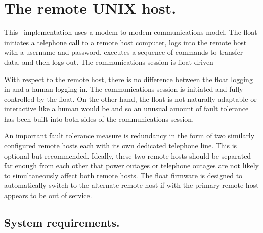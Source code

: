 %
%
%
%
%

\newcommand{\mgetty}{\textbf{mgetty}}
\renewcommand{\-}{\~{\hspace{0in}}}

\section{The remote UNIX host.}
\label{sec:RemoteHost}  

This \iridium\ implementation uses a modem-to-modem communications model.  The
float initiates a telephone call to a remote host computer, logs into the
remote host with a username and password, executes a sequence of commands to
transfer data, and then logs out.  The communications session is float-driven

With respect to the remote host, there is no difference between the float
logging in and a human logging in.  The communications session is initiated
and fully controlled by the float.  On the other hand, the float is not
naturally adaptable or interactive like a human would be and so an unusual
amount of fault tolerance has been built into both sides of the
communications session.

An important fault tolerance measure is redundancy in the form of two
similarly configured remote hosts each with its own dedicated telephone
line.  This is optional but recommended.  Ideally, these two remote hosts
should be separated far enough from each other that power outages or
telephone outages are not likely to simultaneously affect both remote hosts.
The float firmware is designed to automatically switch to the alternate
remote host if with the primary remote host appears to be out of service.

\subsection{System requirements.}
\label{sec:SystemRequirements}

